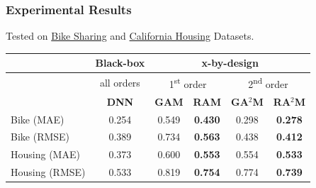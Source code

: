 \documentclass{beamer}
\begin{document}
\begin{frame}
  \frametitle{Experimental Results}

  Tested on \href{https://archive.ics.uci.edu/dataset/275/bike+sharing+dataset}{Bike Sharing} and \href{https://inria.github.io/scikit-learn-mooc/python_scripts/datasets_california_housing.html}{California Housing} Datasets.

\noindent\makebox[\linewidth]{\rule{\paperwidth}{0.4pt}}

\begin{table}[htbp]
  \centering
  \label{tab:sample}
  \begin{tabular}{l|c|cccc}
      & \textbf{Black-box} & \multicolumn{4}{c}{\textbf{x-by-design}} \\
      \hline
      \hline
      & all orders & \multicolumn{2}{c}{1\textsuperscript{st} order} & \multicolumn{2}{c}{2\textsuperscript{nd} order} \\
      \hline
      \hline
      & \textbf{DNN} & \textbf{GAM} & \textbf{RAM} & \textbf{GA}$^2$\textbf{M} & \textbf{RA}$^2$\textbf{M} \\
      \hline
      Bike (MAE)  & 0.254 & 0.549 & \textbf{0.430} & 0.298 & \textbf{0.278} \\
      Bike (RMSE) & 0.389 & 0.734 & \textbf{0.563} & 0.438 & \textbf{0.412} \\
      \hline
      Housing (MAE)  & 0.373 & 0.600 & \textbf{0.553} & 0.554 & \textbf{0.533} \\
      Housing (RMSE) & 0.533 & 0.819 & \textbf{0.754} & 0.774 & \textbf{0.739} \\
  \end{tabular}
\end{table}

\end{frame}
\end{document}
